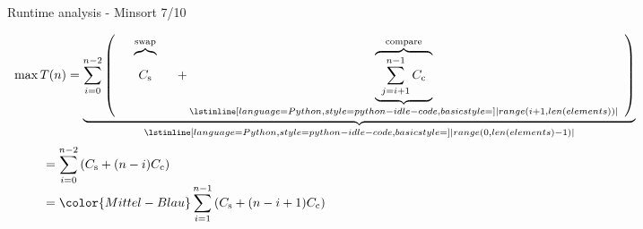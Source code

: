 \begin{frame}{Runtime analysis - Minsort 7/10}
  \begin{center}
    \begin{math}
      \begin{array}{l}
        \displaystyle
        \max T(n) = \underbrace{
          \sum^{n - 2}_{i = 0}
          \left(
            \hspace*{1.5em}
            \overbrace{
              C_\text{s}
              \vphantom{
                \sum^{n - 1}_{j = i + 1}
              }
            }^\text{swap}
            \hspace*{1.5em} +
            \underbrace{
              \overbrace{
                \hspace*{0.5em}
                \sum^{n - 1}_{j = i + 1} C_\text{c}
                \hspace*{0.5em}
              }^\text{compare}
            }_{
            \lstinline[
              language=Python,
              style={python-idle-code},
              basicstyle=\small
              ]|range(i+1, len(elements))|
            }
            \hspace*{0.5em}
          \right)
        }_{
        \lstinline[
          language=Python,
          style={python-idle-code},
          basicstyle=\small
        ]|range(0, len(elements)-1)|
      }\\[5em]
      \displaystyle\hspace*{2.5em}
        = \sum^{n - 2}_{i = 0} \left(C_\text{s} + (n - i) C_\text{c}\right)\\
      \displaystyle\hspace*{2.5em}
        = \color{Mittel-Blau}
        \sum^{n - 1}_{i = 1} \left(C_\text{s} + (n - i + 1) C_\text{c}\right)
      \end{array}
    \end{math}
  \end{center}
\end{frame}


